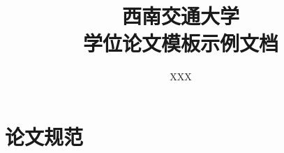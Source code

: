 \documentclass[doctor]{swjtuthesis}
\title{西南交通大学\\学位论文模板示例文档}
\author{XXX}
\begin{document}
\maketitle

%

\frontmatter

\tableofcontents
\listoffigures
\listoftables
% 

\mainmatter






\appendix
\chapter{论文规范}

\backmatter


\end{document}

